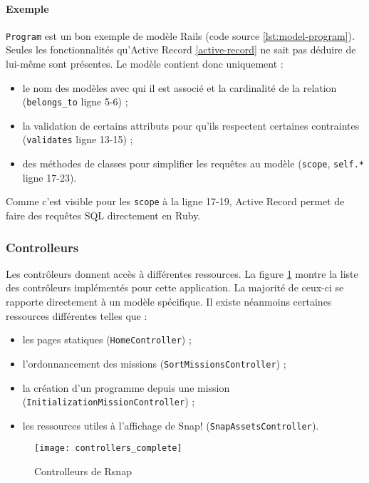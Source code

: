 \paragraph{Exemple} \texttt{Program} est un bon exemple de modèle Rails (code source \ref{lst:model-program}). Seules les fonctionnalités qu’Active Record \ref{active-record} ne sait pas déduire de lui-même sont présentes. Le modèle contient donc uniquement :
\begin{itemize}
  \item le nom des modèles avec qui il est associé et la cardinalité de la relation (\lstinline[language=Rails]{belongs_to} ligne 5-6) ;
  \item la validation de certains attributs pour qu'ils respectent certaines contraintes (\lstinline[language=Rails]{validates} ligne 13-15) ;
  \item des méthodes de classes pour simplifier les requêtes au modèle (\lstinline[language=Rails]{scope},  \lstinline[language=Rails]{self.*} ligne 17-23).
\end{itemize}

Comme c'est visible pour les \lstinline[language=Rails]{scope} à la ligne 17-19, Active Record permet de faire des requêtes SQL directement en Ruby. 


\subsubsection{Controlleurs}
Les contrôleurs donnent accès à différentes ressources. La figure \ref{fig:controllers} montre la liste des contrôleurs implémentés pour cette application. La majorité de ceux-ci se rapporte directement à un modèle spécifique. Il existe néanmoins certaines ressources différentes telles que : 
\begin{itemize}
  \item les pages statiques (\texttt{HomeController}) ;
  \item l'ordonnancement des missions (\texttt{SortMissionsController}) ; 
    \item la création d'un programme depuis une mission (\texttt{InitializationMissionController}) ;
      \item les ressources utiles à l'affichage de Snap! (\texttt{SnapAssetsController}).
\end{itemize}
\begin{figure}
 \begin{center}
   \texttt{[image: controllers\_complete]}
   \caption{Controlleurs de Rsnap}
   \label{fig:controllers}
 \end{center}
\end{figure}

